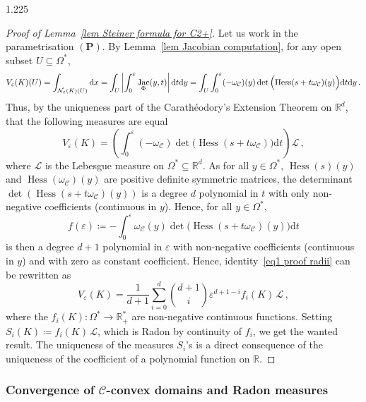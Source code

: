 \documentclass[reqno, a4paper]{amsart}
\numberwithin{equation}{section}
\numberwithin{figure}{section}
\theoremstyle{definition}
\theoremstyle{remark}
\newcommand{\R}{\mathbb{R}} %
\newcommand{\dif}{\mathrm{d}} %
\DeclareMathOperator{\Hess}{Hess} %
\DeclareMathOperator{\Jac}{Jac} %
\newcommand{\C}{\mathcal{C}} %
\newcommand{\vp}[1]{{\left( {#1} \right)}} %
\newcommand{\bp}[1]{{\bigl( {#1} \bigr)}} %
\newcommand{\Bp}[1]{{\Bigl({#1}\Bigr)}} %
\begin{document}
\begin{spacing}{1.225}
\begin{proof}[Proof of Lemma~\ref{lem Steiner formula for C2+}]
Let us work in the parametrisation $(\mathbf{P})$. By Lemma~\ref{lem Jacobian computation}, for any open subset $U \subseteq \Omega^*$,
\begin{equation*}
V_\varepsilon(K)(U) = \int_{\mathcal{N}_\varepsilon(K)(U)} \dif x = \int_U \left\vert \int_0^\varepsilon \Jac_\Phi(y,t) \right\vert \dif t \dif y = \int_U \int_0^\varepsilon (-\omega_\C)(y) \det\Bp{\Hess (s + t \omega_\C)(y)} \dif t \dif y \, .
\end{equation*}
Thus, by the uniqueness part of the Carath\'eodory's Extension Theorem on $\R^d$, that the following measures are equal 
\begin{equation}
\label{eq Veps before radii}
V_\varepsilon(K) = \vp{\int_0^\varepsilon (-\omega_\C)\det\bp{\Hess (s + t \omega_\C)} \dif t} \mathcal{L} \, ,
\end{equation}
where $\mathcal{L}$ is the Lebesgue measure on $\Omega^* \subseteq \R^d$. As for all $y \in \Omega^*$, $\Hess(s)(y)$ and $\Hess (\omega_\C)(y)$ are positive definite symmetric matrices, the determinant $\det (\Hess (s+t\omega_\C)(y))$ is a degree $d$ polynomial in $t$ with only non-negative coefficients (continuous in $y$). Hence, for all $y \in \Omega^*$,
\begin{equation*}
 f(\varepsilon) \coloneqq -\int_0^\varepsilon \omega_\C(y) \det\bp{\Hess (s + t \omega_\C)(y)} \dif t
\end{equation*}
is then a degree $d+1$ polynomial in $\varepsilon$ with non-negative coefficients (continuous in $y$) and with zero as constant coefficient. Hence, identity~\eqref{eq1 proof radii} can be rewritten as 
\begin{equation*}
V_\varepsilon(K) = \frac{1}{d+1}\sum_{i=0}^d \binom{d+1}{i}\varepsilon^{d+1-i} f_i(K) \, \mathcal{L} \, ,
\end{equation*}
where the $f_i(K) : \Omega^* \to \R^*_+$ are non-negative continuous functions. Setting $S_i(K) \coloneqq f_i(K) \, \mathcal{L}$, which is Radon by continuity of $f_i$, we get the wanted result. The uniqueness of the measures $S_i$'s is a direct consequence of the uniqueness of the coefficient of a polynomial function on $\R$.
\end{proof}

\subsubsection{\texorpdfstring{Convergence of $\C$-convex domains and Radon measures}{Convergence of C-convex domains and Radon measures}}


\end{spacing}
\end{document}
